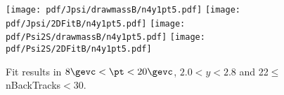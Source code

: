 \begin{figure}[H]
\begin{center}
\texttt{[image: pdf/Jpsi/drawmassB/n4y1pt5.pdf]}
\texttt{[image: pdf/Jpsi/2DFitB/n4y1pt5.pdf]}
\vspace*{-0.5cm}
\texttt{[image: pdf/Psi2S/drawmassB/n4y1pt5.pdf]}
\texttt{[image: pdf/Psi2S/2DFitB/n4y1pt5.pdf]}
\vspace*{-0.5cm}
\end{center}
\caption{Fit results in $8\gevc<\pt<20\gevc$, $2.0<y<2.8$ and 22$\leq$nBackTracks$<$30.}
\label{Fitn4y1pt5}
\end{figure}

